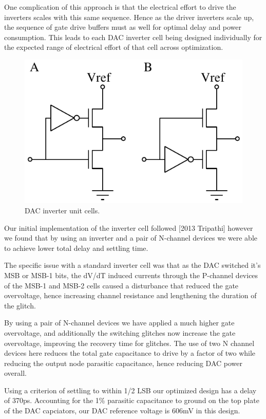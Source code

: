 \documentclass[10pt,journal]{IEEEtran}\usepackage{longtable}
\begin{document}
One complication of this approach is that the electrical effort to drive the inverters scales with this same sequence. 
Hence as the driver inverters scale up, the sequence of gate drive buffers must as well for optimal delay and power consumption.
This leads to each DAC inverter cell being designed individually for the expected range of electrical effort of that cell across optimization.

\begin{figure}[tbph]
\begin{center}
\includegraphics[width=0.5\columnwidth]{DAC_Switch.pdf}
\caption{DAC inverter unit cells.}
\label{fig:DACUnitInverterSch}
\end{center}
\end{figure}


Our initial implementation of the inverter cell followed [2013 Tripathi] however we found that by using an inverter and a pair of N-channel devices we were able to achieve lower total delay and settling time. 

The specific issue with a standard inverter cell was that as the DAC switched it's MSB or MSB-1 bits, the dV/dT induced currents through the P-channel devices of the MSB-1 and MSB-2 cells caused a disturbance that reduced the gate overvoltage, hence increasing channel resistance and lengthening the duration of the glitch. 

By using a pair of N-channel devices we have applied a much higher gate overvoltage, and additionally the switching glitches now increase the gate overvoltage, improving the recovery time for glitches.
The use of two N channel devices here reduces the total gate capacitance to drive by a factor of two while reducing the output node parasitic capacitance, hence reducing DAC power overall.

Using a criterion of settling to within 1/2 LSB our optimized design has a delay of 370ps.
Accounting for the 1\% parasitic capacitance to ground on the top plate of the DAC capciators, our DAC reference voltage is 606mV in this design. 
\end{document}
